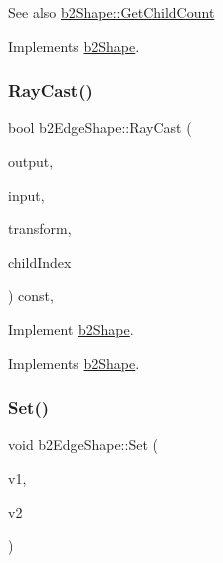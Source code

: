 \begin{DoxySeeAlso}{See also}
\mbox{\hyperlink{classb2_shape_a05a3c445017d96df9238ceefe6ce37ab}{b2\+Shape\+::\+Get\+Child\+Count}} 
\end{DoxySeeAlso}


Implements \mbox{\hyperlink{classb2_shape_a05a3c445017d96df9238ceefe6ce37ab}{b2\+Shape}}.

\mbox{\label{classb2_edge_shape_a192cf10bd556a5a90b29a2bcee2ddd75}} 
\subsubsection{\texorpdfstring{RayCast()}{RayCast()}}
{\footnotesize\ttfamily bool b2\+Edge\+Shape\+::\+Ray\+Cast (\begin{DoxyParamCaption}\item[{\mbox{\hyperlink{structb2_ray_cast_output}{b2\+Ray\+Cast\+Output}} $\ast$}]{output,  }\item[{const \mbox{\hyperlink{structb2_ray_cast_input}{b2\+Ray\+Cast\+Input}} \&}]{input,  }\item[{const \mbox{\hyperlink{structb2_transform}{b2\+Transform}} \&}]{transform,  }\item[{\mbox{\hyperlink{b2_settings_8h_a43d43196463bde49cb067f5c20ab8481}{int32}}}]{child\+Index }\end{DoxyParamCaption}) const\hspace{0.3cm}{\ttfamily [override]}, {\ttfamily [virtual]}}



Implement \mbox{\hyperlink{classb2_shape}{b2\+Shape}}. 



Implements \mbox{\hyperlink{classb2_shape_aee53a926f4fe64cd03693f6211ef6335}{b2\+Shape}}.

\mbox{\label{classb2_edge_shape_a67dd3b17630a600033cb4380697a4e9d}} 
\subsubsection{\texorpdfstring{Set()}{Set()}}
{\footnotesize\ttfamily void b2\+Edge\+Shape\+::\+Set (\begin{DoxyParamCaption}\item[{const \mbox{\hyperlink{structb2_vec2}{b2\+Vec2}} \&}]{v1,  }\item[{const \mbox{\hyperlink{structb2_vec2}{b2\+Vec2}} \&}]{v2 }\end{DoxyParamCaption})}



